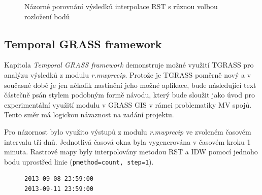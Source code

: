 \documentclass[a4paper,12pt,oneside]{report}
\begin{document}
\begin{figure}[h!]%
    \centering
    \qquad
    \caption[Interpolace RST]{Názorné porovnání  výsledků interpolace RST s různou volbou rozložení bodů \centering}%
    \label{fig:example}%
\end{figure}

\subsection{Temporal GRASS framework}
Kapitola \textit{Temporal GRASS framework} demonstruje možné využití
TGRASS pro analýzu výsledků z modulu \textit{r.mwprecip}.  Protože je
TGRASS poměrně nový a v současné době je jen několik nastínění jeho
možné aplikace, bude následující text částečně psán stylem podobným
formě návodu, který bude sloužit jako úvod pro experimentální využití
modulu v GRASS GIS v rámci problematiky MV spojů. Tento směr má
logickou návaznost na zadání projektu.


Pro názornost bylo využito výstupů z modulu \textit{r.mwprecip} ve
zvoleném časovém intervalu tří dnů. Jednotlivá časová okna byla
vygenerována v časovém kroku 1 minuta.  Rastrové mapy byly
interpolovány metodou RST a IDW pomocí jednoho bodu uprostřed linie
(\texttt{pmethod=count, step=1}).
\begin{figure}[h!]
\begin{footnotesize}
\lstset{extendedchars=false,
escapeinside=''}
\begin{lstlisting}[style=mybash]
2013-09-08 23:59:00
2013-09-11 23:59:00                       
\end{lstlisting}
\end{footnotesize} 
\end{figure}
\end{document}
